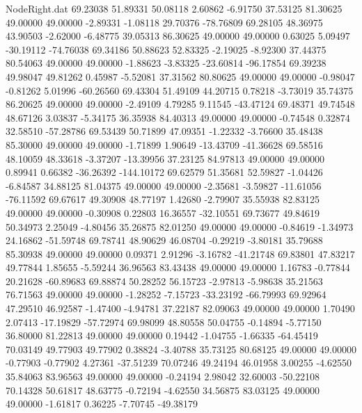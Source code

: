\begin{filecontents}{NodeRight.dat}
  69.23038   51.89331   50.08118     2.60862   -6.91750   37.53125   81.30625   49.00000   49.00000   -2.89331   -1.08118   29.70376  -78.76809
  69.28105   48.36975   43.90503    -2.62000   -6.48775   39.05313   86.30625   49.00000   49.00000    0.63025    5.09497  -30.19112  -74.76038
  69.34186   50.88623   52.83325    -2.19025   -8.92300   37.44375   80.54063   49.00000   49.00000   -1.88623   -3.83325  -23.60814  -96.17854
  69.39238   49.98047   49.81262     0.45987   -5.52081   37.31562   80.80625   49.00000   49.00000   -0.98047   -0.81262    5.01996  -60.26560
  69.43304   51.49109   44.20715     0.78218   -3.73019   35.74375   86.20625   49.00000   49.00000   -2.49109    4.79285    9.11545  -43.47124
  69.48371   49.74548   48.67126     3.03837   -5.34175   36.35938   84.40313   49.00000   49.00000   -0.74548    0.32874   32.58510  -57.28786
  69.53439   50.71899   47.09351    -1.22332   -3.76600   35.48438   85.30000   49.00000   49.00000   -1.71899    1.90649  -13.43709  -41.36628
  69.58516   48.10059   48.33618    -3.37207  -13.39956   37.23125   84.97813   49.00000   49.00000    0.89941    0.66382  -36.26392 -144.10172
  69.62579   51.35681   52.59827    -1.04426   -6.84587   34.88125   81.04375   49.00000   49.00000   -2.35681   -3.59827  -11.61056  -76.11592
  69.67617   49.30908   48.77197     1.42680   -2.79907   35.55938   82.83125   49.00000   49.00000   -0.30908    0.22803   16.36557  -32.10551
  69.73677   49.84619   50.34973     2.25049   -4.80456   35.26875   82.01250   49.00000   49.00000   -0.84619   -1.34973   24.16862  -51.59748
  69.78741   48.90629   46.08704    -0.29219   -3.80181   35.79688   85.30938   49.00000   49.00000    0.09371    2.91296   -3.16782  -41.21748
  69.83801   47.83217   49.77844     1.85655   -5.59244   36.96563   83.43438   49.00000   49.00000    1.16783   -0.77844   20.21628  -60.89683
  69.88874   50.28252   56.15723    -2.97813   -5.98638   35.21563   76.71563   49.00000   49.00000   -1.28252   -7.15723  -33.23192  -66.79993
  69.92964   47.29510   46.92587    -1.47400   -4.94781   37.22187   82.09063   49.00000   49.00000    1.70490    2.07413  -17.19829  -57.72974
  69.98099   48.80558   50.04755    -0.14894   -5.77150   36.80000   81.22813   49.00000   49.00000    0.19442   -1.04755   -1.66335  -64.45419
  70.03149   49.77903   49.77902     0.38824   -3.40788   35.73125   80.68125   49.00000   49.00000   -0.77903   -0.77902    4.27361  -37.51239
  70.07246   49.24194   46.01958     3.00255   -4.62550   35.84063   83.96563   49.00000   49.00000   -0.24194    2.98042   32.60003  -50.22108
  70.14328   50.61817   48.63775    -0.72194   -4.62550   34.56875   83.03125   49.00000   49.00000   -1.61817    0.36225   -7.70745  -49.38179

\end{filecontents}
